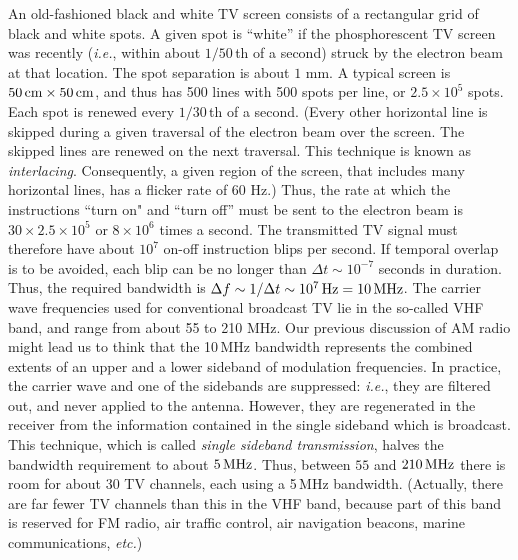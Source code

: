 An old-fashioned black and white TV screen consists of a rectangular grid
of black and white spots. A given spot is ``white'' if the phosphorescent TV
screen was recently ({\em i.e.}, within about $1/50$\,th of a second) struck by the
electron beam at that location. The spot separation is about $1$ mm. A typical
screen is $50\,{\rm cm}\times 50\,{\rm cm}$, and thus has 500 lines with
500 spots per line, or $2.5\times 10^5$ spots. Each spot is renewed every $1/30$\,th of 
a second. (Every other horizontal line is skipped during a given traversal of the
electron beam over the screen. The skipped lines are renewed on the next
traversal. This technique is known as {\em interlacing}. Consequently, a given region of the screen, that includes many horizontal lines,
has a flicker rate of 60 Hz.) Thus, the rate at which the instructions ``turn on" and
``turn off'' must be sent to the electron beam is $30\times 2.5\times 10^5$ or
$8\times 10^6$ times a second. The transmitted TV signal must therefore
have about $10^7$ on-off instruction blips per second. If temporal overlap is to be avoided, each blip can be no
longer than $\Delta t \sim 10^{-7}$ seconds in duration.
Thus, the required bandwidth is $\Delta f\sim 1/\Delta t\sim 10^7\,{\rm Hz}=10\,{\rm MHz}$. The carrier wave frequencies used for conventional broadcast TV lie in the
so-called VHF band, and range
from about 55 to 210 MHz. Our previous discussion of AM radio might lead us
to think that the 10\,MHz bandwidth represents the combined extents of an upper and a lower
sideband of modulation frequencies. In practice, the carrier wave and one
of the sidebands are suppressed: {\em i.e.}, they are filtered out, and never applied
to the antenna. However, they are regenerated in the receiver from the information
contained in the single sideband which is broadcast. This technique, which
is called {\em single sideband transmission}, halves the bandwidth
requirement to about $5\,{\rm MHz}$. Thus, between $55$ and $210\,{\rm MHz}$
there is room for about 30 TV channels, each using a 5\,MHz bandwidth. (Actually,
there are far fewer TV channels than this in the VHF band, because part of this
band is reserved for FM radio, air traffic control, air navigation beacons, marine communications, {\em etc.})

